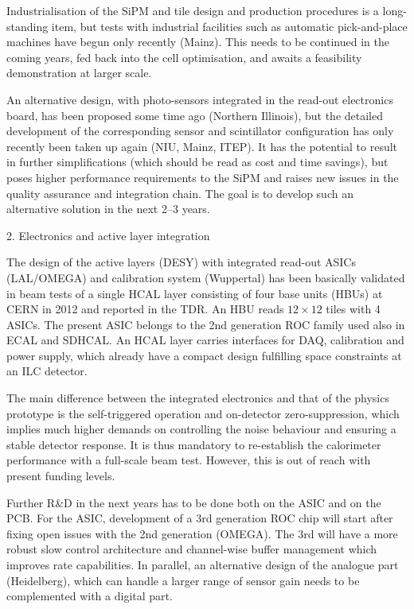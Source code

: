Industrialisation of the SiPM and tile design and production procedures is a long-standing item, but tests with industrial facilities such as automatic pick-and-place machines have begun only recently (Mainz). This needs to be continued in the coming years, fed back into the cell optimisation, and awaits a feasibility demonstration at larger scale. 

An alternative design, with photo-sensors integrated in the read-out electronics board, has been proposed some time ago (Northern Illinois), but the detailed development of the corresponding sensor and scintillator configuration has only recently been taken up again (NIU, Mainz, ITEP). It has the potential to result in further simplifications (which should be read as cost and time savings), but poses higher performance requirements to the SiPM and raises new issues in the quality assurance and integration chain. The goal is to develop such an alternative solution in the next 2--3 years.
 
2.  Electronics and active layer integration

The design of the active layers (DESY) with integrated read-out ASICs (LAL/OMEGA) and calibration system (Wuppertal) has been basically validated in beam tests of a single HCAL layer consisting of four base units (HBUs) at CERN in 2012 and reported in the TDR. An HBU reads $12 \times 12$ tiles with 4 ASICs. The present ASIC belongs to the 2nd generation ROC family used also in ECAL and SDHCAL. An HCAL layer carries interfaces for DAQ, calibration and power supply, which already have a compact design fulfilling space constraints at an ILC detector. 

The main difference between the integrated electronics and that of the physics prototype is the self-triggered operation and on-detector zero-suppression, which implies much higher demands on controlling the noise behaviour and ensuring a stable detector response. It is thus mandatory to re-establish the calorimeter performance with a full-scale beam test. However, this is out of reach with present funding levels. 

Further R\&D in the next years has to be done both on the ASIC and on the PCB. For the ASIC, development of a 3rd generation ROC chip will start after fixing open issues with the 2nd generation (OMEGA). The 3rd will have a more robust slow control architecture and channel-wise buffer management which improves rate capabilities. In parallel, an alternative design of the analogue part (Heidelberg), which can handle a larger range of sensor gain needs to be complemented with a digital part. 

